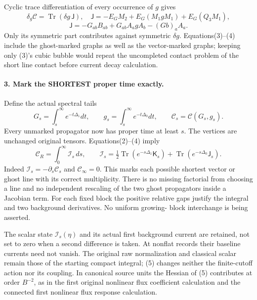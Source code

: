\documentclass[11pt]{article}
\begin{document}
Cyclic trace differentiation of every occurrence of $g$ gives
\[
 \delta_g\mathcal C=\operatorname{Tr}(\delta g\,\mathsf J),\quad
 \mathsf J=-E_GM_2+E_G(M_1gM_1)+E_G(Q_3M_1),
\]
\[
 \boxed{\mathsf J=-G_{ab}B_{ab}+G_{ab}A_agA_b-(Gb)_aA_a.}        \tag{4}
\]
Only its symmetric part contributes against symmetric $\delta g$.
Equations(3)--(4) include the ghost-marked graphs as well as the
vector-marked graphs; keeping only (3)'s cubic bubble would repeat the
uncompleted contact problem of the short line contact before current decay calculation.

\paragraph{3. Mark the SHORTEST proper time exactly.}
Define the actual spectral tails
\[
 G_s=\int_s^\infty e^{-t\Delta_1}dt,\qquad
 g_s=\int_s^\infty e^{-t\Delta_0}dt,
 \qquad \mathcal C_s=\mathcal C(G_s,g_s).
\]
Every unmarked propagator now has proper time at least $s$. The vertices
are unchanged original tensors. Equations(2)--(4) imply
\[
 \boxed{\mathcal C_R=\int_0^\infty\mathcal I_s\,ds,\qquad
 \mathcal I_s=\tfrac12\operatorname{Tr}(e^{-s\Delta_1}\mathsf K_s)
                   +\operatorname{Tr}(e^{-s\Delta_0}\mathsf J_s).} \tag{5}
\]
Indeed $\mathcal I_s=-\partial_s\mathcal C_s$ and
$\mathcal C_\infty=0$. This marks each possible shortest vector or ghost
line with its correct multiplicity. There is no missing factorial from
choosing a line and no independent rescaling of the two ghost propagators
inside a Jacobian term. For each fixed block the positive relative gaps
justify the integral and two background derivatives. No uniform growing-
block interchange is being asserted.

The scalar state $\mathcal I_s(\eta)$ and its actual first background
current are retained, not set to zero when a second difference is taken.
At nonflat records their baseline currents need not vanish. The original
raw normalization and classical scalar remain those of the starting
compact integral; (5) changes neither the finite-cutoff action nor its
coupling. In canonical source units the Hessian of (5) contributes at
order $B^{-2}$, as in the first original nonlinear flux coefficient calculation and the connected first nonlinear flux response calculation.
\end{document}
